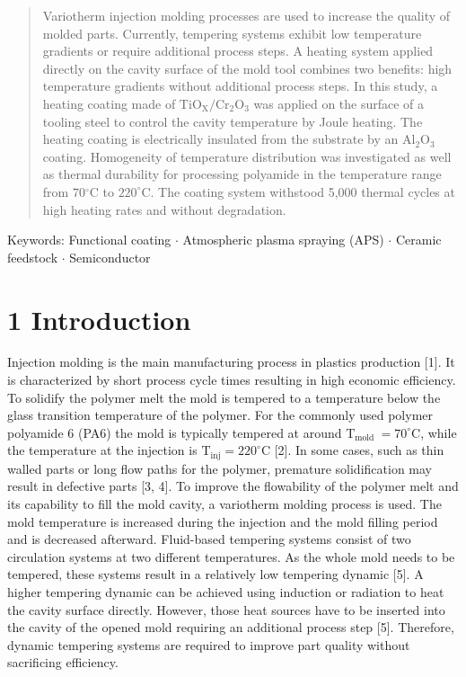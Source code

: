 \documentclass[10pt]{article}
\begin{document}
\begin{abstract}
Variotherm injection molding processes are used to increase the quality of molded parts. Currently, tempering systems exhibit low temperature gradients or require additional process steps. A heating system applied directly on the cavity surface of the mold tool combines two benefits: high temperature gradients without additional process steps. In this study, a heating coating made of $\mathrm{TiO}_{\mathrm{X}} / \mathrm{Cr}_{2} \mathrm{O}_{3}$ was applied on the surface of a tooling steel to control the cavity temperature by Joule heating. The heating coating is electrically insulated from the substrate by an $\mathrm{Al}_{2} \mathrm{O}_{3}$ coating. Homogeneity of temperature distribution was investigated as well as thermal durability for processing polyamide in the temperature range from $70{ }^{\circ} \mathrm{C}$ to $220^{\circ} \mathrm{C}$. The coating system withstood 5,000 thermal cycles at high heating rates and without degradation.
\end{abstract}

Keywords: Functional coating $\cdot$ Atmospheric plasma spraying (APS) $\cdot$ Ceramic feedstock $\cdot$ Semiconductor

\section*{1 Introduction}
Injection molding is the main manufacturing process in plastics production [1]. It is characterized by short process cycle times resulting in high economic efficiency. To solidify the polymer melt the mold is tempered to a temperature below the glass transition temperature of the polymer. For the commonly used polymer polyamide 6 (PA6) the mold is typically tempered at around $\mathrm{T}_{\text {mold }}=70^{\circ} \mathrm{C}$, while the temperature at the injection is $\mathrm{T}_{\mathrm{inj}}=220^{\circ} \mathrm{C}$ [2]. In some cases, such as thin walled parts or long flow paths for the polymer, premature solidification may result in defective parts [3, 4]. To improve the flowability of the polymer melt and its capability to fill the mold cavity, a variotherm molding process is used. The mold temperature is increased during the injection and the mold filling period and is decreased afterward. Fluid-based tempering systems consist of two circulation systems at two different temperatures. As the whole mold needs to be tempered, these systems result in a relatively low tempering dynamic [5]. A higher tempering dynamic can be achieved using induction or radiation to heat the cavity surface directly. However, those heat sources have to be inserted into the cavity of the opened mold requiring an additional process step [5]. Therefore, dynamic tempering systems are required to improve part quality without sacrificing efficiency.
\end{document}
